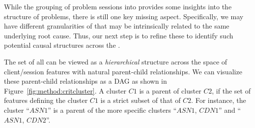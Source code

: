 
While the grouping of problem sessions into \problemclusters  
provides some insights into the structure of problems, 
there is still one key missing aspect. 
Specifically, we may have different granularities of \problemclusters
that may be intrinsically related to the same underlying root cause.
Thus, our next step is to refine these \problemclusters to identify such
potential causal structures across the \problemsessions. 

The set of all \clusters can be viewed as a \emph{hierarchical}
structure across the space of client/session features 
 with natural parent-child relationships. We can visualize
these parent-child relationships as a DAG as shown in 
Figure~\ref{fig:method:critcluster}.  
A cluster $\mathit{C1}$ is a parent of cluster $\mathit{C2}$, 
if the set of features defining the  cluster $\mathit{C1}$
is a strict subset of that of $\mathit{C2}$. 
For instance, the  cluster ``$\mathit{ASN1}$'' is a parent of
the more specific clusters ``$\mathit{ASN1}$, $\mathit{CDN1}$'' 
and   `` $\mathit{ASN1}$, $\mathit{CDN2}$''. 


